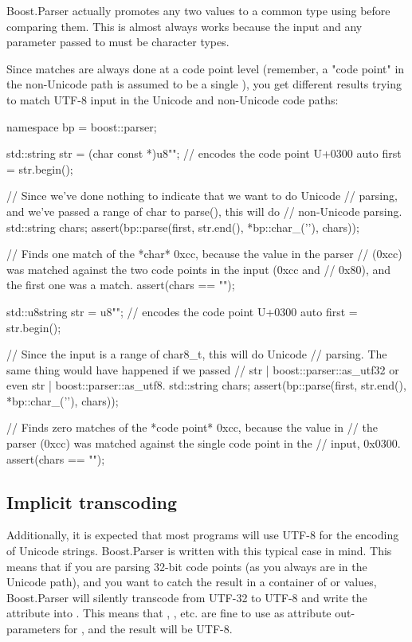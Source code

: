 \documentclass{MyBook}
\begin{document}
\begin{marker}[title=Note ]
Boost.Parser actually promotes any two values to a common type using  before comparing them. This is almost always works because the input and any parameter passed to  must be character types. 
\end{marker}

Since matches are always done at a code point level (remember, a "code point" in the non-Unicode path is assumed to be a single ), you get different results trying to match UTF-8 input in the Unicode and non-Unicode code paths:

\begin{code}
namespace bp = boost::parser;

{
    std::string str = (char const *)u8"\xcc{}"; // encodes the code point U+0300
    auto first = str.begin();

    // Since we've done nothing to indicate that we want to do Unicode
    // parsing, and we've passed a range of char to parse(), this will do
    // non-Unicode parsing.
    std::string chars;
    assert(bp::parse(first, str.end(), *bp::char_('\xcc'), chars));

    // Finds one match of the *char* 0xcc, because the value in the parser
    // (0xcc) was matched against the two code points in the input (0xcc and
    // 0x80), and the first one was a match.
    assert(chars == "\xcc");
}
{
    std::u8string str = u8"\xcc{}"; // encodes the code point U+0300
    auto first = str.begin();

    // Since the input is a range of char8_t, this will do Unicode
    // parsing.  The same thing would have happened if we passed
    // str | boost::parser::as_utf32 or even str | boost::parser::as_utf8.
    std::string chars;
    assert(bp::parse(first, str.end(), *bp::char_('\xcc'), chars));

    // Finds zero matches of the *code point* 0xcc, because the value in
    // the parser (0xcc) was matched against the single code point in the
    // input, 0x0300.
    assert(chars == "");
}
\end{code}

\subsection{Implicit transcoding}

Additionally, it is expected that most programs will use UTF-8 for the encoding of Unicode strings. Boost.Parser is written with this typical case in mind. This means that if you are parsing 32-bit code points (as you always are in the Unicode path), and you want to catch the result in a container  of  or  values, Boost.Parser will silently transcode from UTF-32 to UTF-8 and write the attribute into . This means that , , etc. are fine to use as attribute out-parameters for , and the result will be UTF-8.
\end{document}
